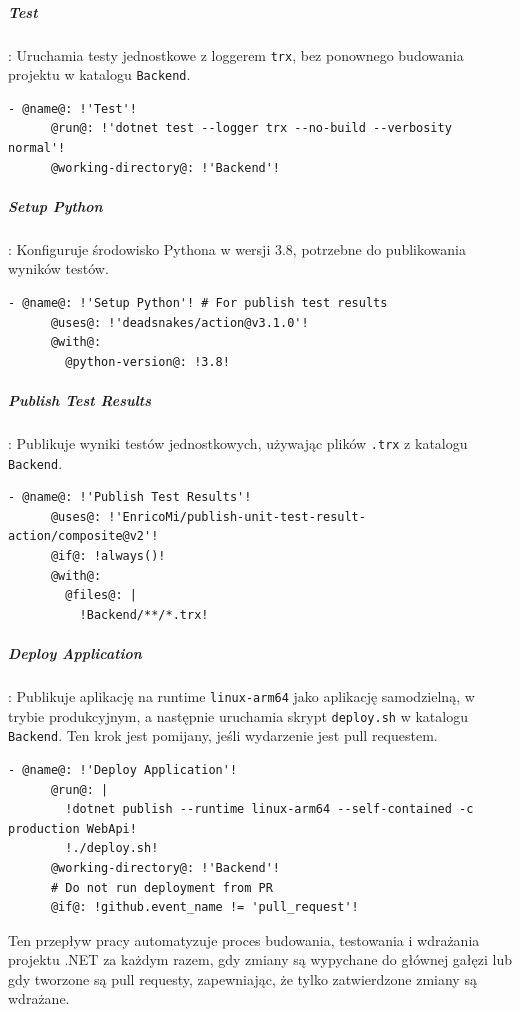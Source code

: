 \subparagraph{Test}: Uruchamia testy jednostkowe z loggerem \texttt{\textcolor{codeblue}{trx}}, bez ponownego budowania projektu w katalogu \texttt{\textcolor{codeblue}{Backend}}.
\begin{lstlisting}[style=yaml-colored]
    - @name@: !'Test'!
      @run@: !'dotnet test --logger trx --no-build --verbosity normal'!
      @working-directory@: !'Backend'!
\end{lstlisting}

\subparagraph{Setup Python}: Konfiguruje środowisko Pythona w wersji 3.8, potrzebne do publikowania wyników testów.
\begin{lstlisting}[style=yaml-colored]
    - @name@: !'Setup Python'! # For publish test results
      @uses@: !'deadsnakes/action@v3.1.0'!
      @with@:
        @python-version@: !3.8!
\end{lstlisting}

\subparagraph{Publish Test Results}: Publikuje wyniki testów jednostkowych, używając plików \texttt{\textcolor{codeblue}{.trx}} z katalogu \texttt{\textcolor{codeblue}{Backend}}.
\begin{lstlisting}[style=yaml-colored]
    - @name@: !'Publish Test Results'!
      @uses@: !'EnricoMi/publish-unit-test-result-action/composite@v2'!
      @if@: !always()!
      @with@:
        @files@: |
          !Backend/**/*.trx!
\end{lstlisting}

\subparagraph{Deploy Application}: Publikuje aplikację na runtime \texttt{\textcolor{codeblue}{linux-arm64}} jako aplikację samodzielną, w trybie produkcyjnym, a następnie uruchamia skrypt \texttt{\textcolor{codeblue}{deploy.sh}} w katalogu \texttt{\textcolor{codeblue}{Backend}}. Ten krok jest pomijany, jeśli wydarzenie jest pull requestem.
\begin{lstlisting}[style=yaml-colored]
    - @name@: !'Deploy Application'!
      @run@: |
        !dotnet publish --runtime linux-arm64 --self-contained -c production WebApi!
        !./deploy.sh!
      @working-directory@: !'Backend'!
      # Do not run deployment from PR
      @if@: !github.event_name != 'pull_request'!
\end{lstlisting}

Ten przepływ pracy automatyzuje proces budowania, testowania i wdrażania projektu .NET za każdym razem, gdy zmiany są wypychane do głównej gałęzi lub gdy tworzone są pull requesty, zapewniając, że tylko zatwierdzone zmiany są wdrażane.

